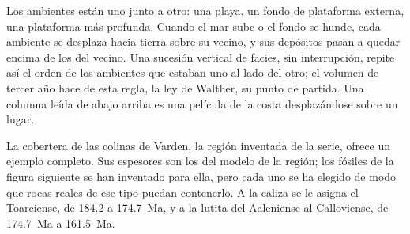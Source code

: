Los ambientes están uno junto a otro: una playa, un fondo de plataforma externa, una plataforma más profunda. Cuando el mar sube o
el fondo se hunde, cada ambiente se desplaza hacia tierra sobre su vecino, y sus depósitos pasan a quedar
encima de los del vecino. Una sucesión vertical de facies, sin interrupción, repite así
el orden de los ambientes que estaban uno al lado del otro; el volumen de tercer año hace de esta regla,
la ley de Walther, su punto de partida. Una columna leída de abajo arriba es una película de la costa desplazándose
sobre un lugar.

La cobertera de las colinas de Varden, la región inventada de la serie, ofrece un ejemplo completo. Sus
espesores son los del modelo de la región; los fósiles de la figura siguiente se han inventado para ella,
pero cada uno se ha elegido de modo que rocas reales de ese tipo puedan contenerlo. A la caliza se le asigna el
Toarciense, de 184.2 a \qty{174.7}{Ma}, y a la lutita del Aaleniense al Calloviense, de
\qty{174.7}{Ma} a \qty{161.5}{Ma}.

